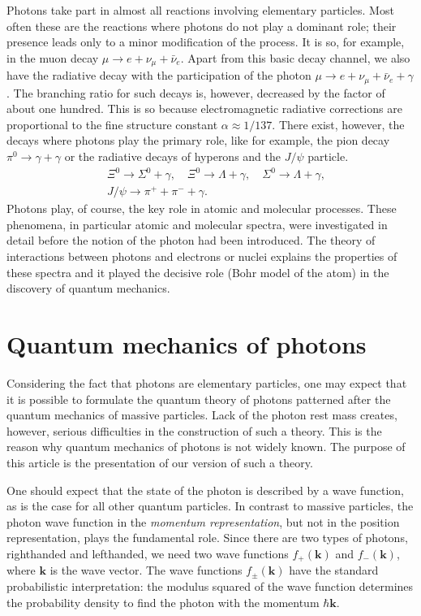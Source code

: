 \documentclass[twocolumn,aps,pra,10pt]{revtex4-1}
\begin{document}
Photons take part in almost all reactions involving elementary particles. Most often these are the reactions where photons do not play a dominant role; their presence leads only to a minor modification of the process. It is so, for example, in the muon decay $\mu\to e+\nu_\mu+\bar{\nu}_e$. Apart from this basic decay channel, we also have the radiative decay with the participation of the photon $\mu\to e+\nu_\mu+\bar{\nu}_e+\gamma$. The branching ratio for such decays is, however, decreased by the factor of about one hundred. This is so because electromagnetic radiative corrections are proportional to the fine structure constant $\alpha\approx 1/137$. There exist, however, the decays where photons play the primary role, like for example, the pion decay $\pi^0\to\gamma+\gamma$ or the radiative decays of hyperons and the $J/\psi$ particle.
\begin{align*}
\quad\Xi^0\to\Sigma^0+\gamma,\quad\Xi^0\to\Lambda+\gamma,
\quad\Sigma^0\to\Lambda+\gamma,\\
\quad J/\psi\to\pi^++\pi^-+\gamma.\hspace{2cm}
\end{align*}
Photons play, of course, the key role in atomic and molecular processes. These phenomena, in particular atomic and molecular spectra, were investigated in detail before the notion of the photon had been introduced. The theory of interactions between photons and electrons or nuclei explains the properties of these spectra and it played the decisive role (Bohr model of the atom) in the discovery of quantum mechanics.

\section{Quantum mechanics of photons}

Considering the fact that photons are elementary particles, one may expect that it is possible to formulate the quantum theory of photons patterned after the quantum mechanics of massive particles. Lack of the photon rest mass creates, however, serious difficulties in the construction of such a theory. This is the reason why quantum mechanics of photons is not widely known. The purpose of this article is the presentation of our version of such a theory.

One should expect that the state of the photon is described by a wave function, as is the case for all other quantum particles. In contrast to massive particles, the photon wave function in the {\em momentum representation}, but not in the position representation, plays the fundamental role. Since there are two types of photons, righthanded and lefthanded, we need two wave functions $f_+(\bm k)$ and $f_-(\bm k)$, where ${\bm k}$ is the wave vector. The wave functions $f_\pm(\bm k)$ have the standard probabilistic interpretation: the modulus squared of the wave function determines the probability density to find the photon with the momentum $\hbar{\bm k}$.
\end{document}
